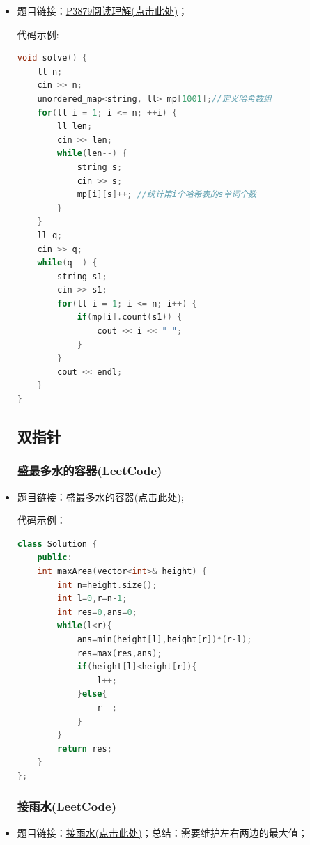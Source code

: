 \begin{itemize}
代码示例：\\
\begin{lstlisting}[language=C++]
void solve(){
	ll n;
	string s;
	cin>>n>>s;
	map<pair<ll,ll>,ll> mp;
	ll d1=0,d2=0,ans=0;
	for(ll i=0;i<n;i++){
		char c=s[i];
		if(c=='A')d1++;
		else if(c=='T')d1--;
		else if(c=='C')d2++;
		else d2--;
		ans+=mp[{d1,d2}];
		mp[{d1,d2}]++;
	}
	cout<<ans<<endl;
}
\end{lstlisting}
\subsubsection{哈希数组(P3879)}
\item 题目链接：\href{https://www.luogu.com.cn/problem/P3879}{P3879阅读理解(点击此处)}；

代码示例:\\
\begin{lstlisting}[language=C++]
void solve() {
	ll n;
	cin >> n;
	unordered_map<string, ll> mp[1001];//定义哈希数组
	for(ll i = 1; i <= n; ++i) {
		ll len;
		cin >> len;
		while(len--) {
			string s;
			cin >> s;
			mp[i][s]++; //统计第i个哈希表的s单词个数
		}
	}
	ll q;
	cin >> q;
	while(q--) {
		string s1;
		cin >> s1;
		for(ll i = 1; i <= n; i++) {
			if(mp[i].count(s1)) {
				cout << i << " ";
			}
		}
		cout << endl;
	}
}
\end{lstlisting}
\subsection{双指针}
\subsubsection{盛最多水的容器(LeetCode)}
\item 题目链接：\href{https://leetcode.cn/problems/container-with-most-water/description/}{盛最多水的容器(点击此处)};

代码示例：\\
\begin{lstlisting}[language=C++]
class Solution {
	public:
	int maxArea(vector<int>& height) {
		int n=height.size();
		int l=0,r=n-1;
		int res=0,ans=0;
		while(l<r){
			ans=min(height[l],height[r])*(r-l);
			res=max(res,ans);
			if(height[l]<height[r]){
				l++;
			}else{
				r--;
			}
		}
		return res;
	}
};
\end{lstlisting}
\subsubsection{接雨水(LeetCode)}
\item 题目链接：\href{https://leetcode.cn/problems/trapping-rain-water/description/}{接雨水(点击此处)}；总结：需要维护左右两边的最大值；


\end{itemize}
